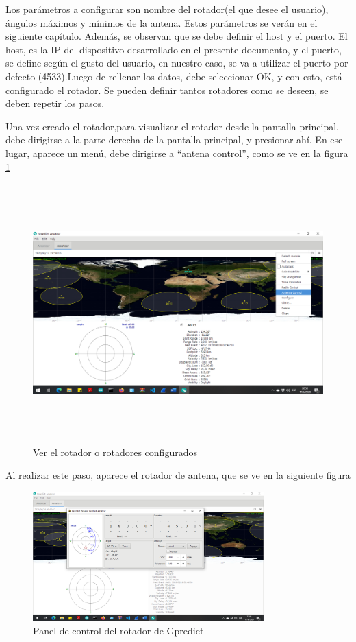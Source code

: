 Los parámetros a configurar son nombre del rotador(el que desee el usuario), ángulos máximos y mínimos de la antena. Estos parámetros se verán en el siguiente capítulo. Además, se observan que se debe definir el host y el puerto. El host, es la IP del dispositivo desarrollado en el presente documento, y el puerto, se define según el gusto del usuario, en nuestro caso, se va a utilizar el puerto por defecto (4533).Luego de rellenar los datos, debe seleccionar OK, y con esto, está configurado el rotador. Se pueden definir tantos rotadores como se deseen, se deben repetir los pasos. 

Una vez creado el rotador,para visualizar el rotador desde la pantalla principal, debe dirigirse a la parte derecha de la pantalla principal, y presionar ahí. En ese lugar, aparece un menú, debe dirigirse a ``antena control'', como se ve en la figura \ref{fig:ant_ctrl} 
\begin{figure}[H]
	\includegraphics[height=10cm,width=\linewidth]{antena_control}
	\caption{Ver el rotador o rotadores configurados} 
	\label{fig:ant_ctrl}
\end{figure}



Al realizar este paso, aparece el rotador de antena, que se ve en la siguiente figura 

\begin{figure}[H]
	\centering 
	\includegraphics[trim=5.4cm 8cm 9.2cm 2.4cm ,clip,width=\linewidth,height=5cm]{antena_gpr_control}
	\caption{Panel de control del rotador de Gpredict} 
	\label{fig:pan_ctrl_antena}
\end{figure}

